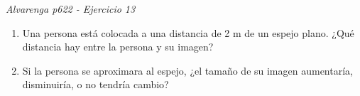 \textit{Alvarenga p622 - Ejercicio 13}
\begin{enumerate}
    \item Una persona está colocada a una distancia de 2 m de un espejo plano. ¿Qué distancia hay entre la persona y su imagen?
    \item Si la persona se aproximara al espejo, ¿el tamaño de su imagen aumentaría, disminuiría, o no tendría cambio?
\end{enumerate}